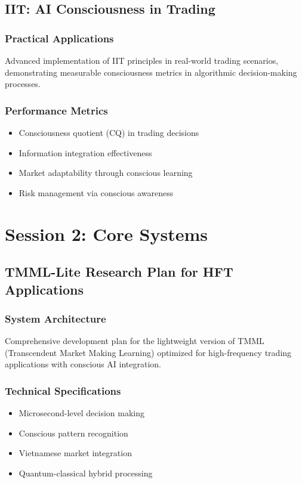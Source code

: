 \documentclass[12pt,oneside]{book}
\begin{document}
\chapter{IIT: AI Consciousness in Trading}
\section{Practical Applications}
Advanced implementation of IIT principles in real-world trading scenarios, demonstrating measurable consciousness metrics in algorithmic decision-making processes.

\section{Performance Metrics}
\begin{itemize}
\item Consciousness quotient (CQ) in trading decisions
\item Information integration effectiveness
\item Market adaptability through conscious learning
\item Risk management via conscious awareness
\end{itemize}

\part*{Session 2: Core Systems}

\chapter{TMML-Lite Research Plan for HFT Applications}
\section{System Architecture}
Comprehensive development plan for the lightweight version of TMML (Transcendent Market Making Learning) optimized for high-frequency trading applications with conscious AI integration.

\section{Technical Specifications}
\begin{itemize}
\item Microsecond-level decision making
\item Conscious pattern recognition
\item Vietnamese market integration
\item Quantum-classical hybrid processing
\end{itemize}
\end{document}
